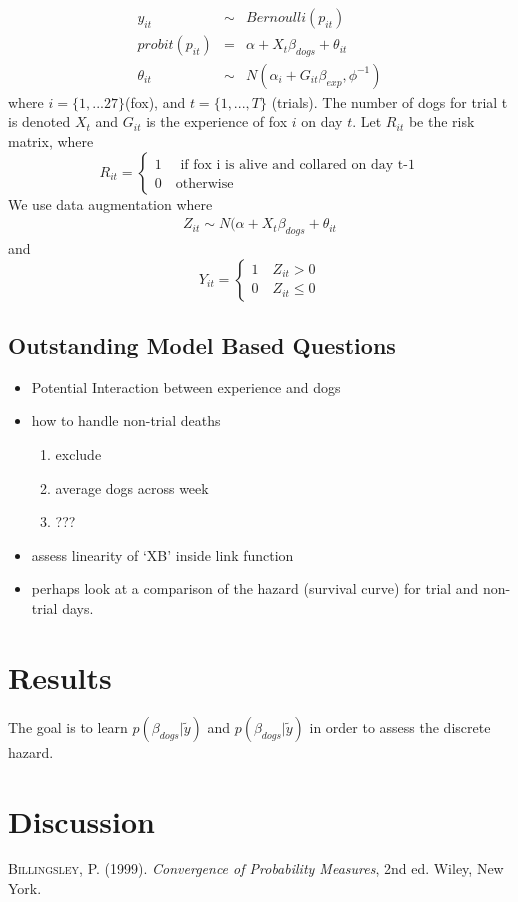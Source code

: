 \documentclass[aoas,preprint]{imsart}
\numberwithin{equation}{section}
\theoremstyle{plain}
\begin{document}
\begin{eqnarray}
y_{it} &\sim& Bernoulli(p_{it}) \\
probit(p_{it}) & = & \alpha + X_{t}\beta_{dogs} + \theta_{it} \\
\theta_{it} &\sim& N(\alpha_{i} + G_{it} \beta_{exp}, \phi^{-1})
\end{eqnarray}
where $i = \{1,...27\} $(fox), and $t= \{1,...,T\}$ (trials). The number of dogs for trial t is denoted $X_t$ and $G_{it}$ is the experience of fox $i$ on day $t$. Let $R_{it}$ be the risk matrix, where
\[
    R_{it}=\left\{
                \begin{array}{ll}
                  1 \quad \text{ if fox i is alive and collared on day t-1}\\
                  0 \quad \text{otherwise}
                \end{array}
              \right.
  \]
  We use data augmentation where 
  \begin{eqnarray}
  Z_{it} \sim N( \alpha + X_t\beta_{dogs} +\theta_{it}
  \end{eqnarray}
  and
\[
    Y_{it}=\left\{
                \begin{array}{ll}
                  1 \quad  Z_{it} > 0\\
                  0 \quad Z_{it} \leq 0
                \end{array}
              \right.
  \]
  
  \subsection{Outstanding Model Based Questions}
  \begin{itemize}
  \item Potential Interaction between experience and dogs
  \item how to handle non-trial deaths
  \begin{enumerate}
  \item exclude
  \item average dogs across week
  \item ???
  \end{enumerate}
  \item assess linearity of `XB' inside link function
  \item perhaps look at a comparison of the hazard (survival curve) for trial and non-trial days.
  \end{itemize}
  
\section{Results}
The goal is to learn $p(\beta_{dogs}|\tilde{y})$ and $p(\beta_{dogs}|\tilde{y})$ in order to assess the discrete hazard.
\section{Discussion}

\newpage



\begin{thebibliography}{9}

\textsc{Billingsley, P.} (1999). \textit{Convergence of
Probability Measures}, 2nd ed.
Wiley, New York.


\end{thebibliography}
\end{document}
